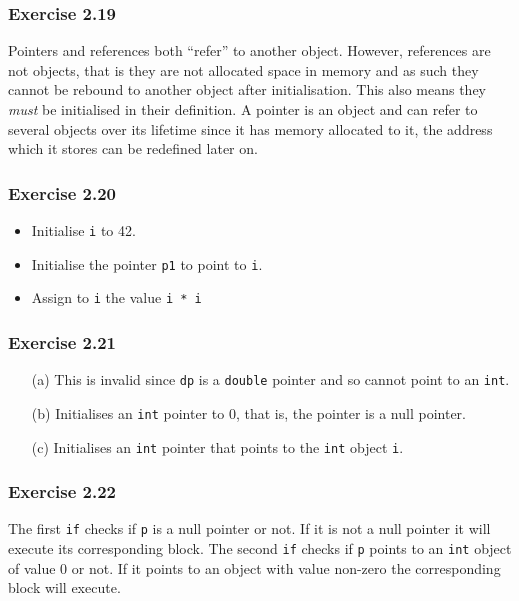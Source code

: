 \documentclass[12pt, a4paper]{article}
\begin{document}
\subsubsection*{Exercise 2.19}
Pointers and references both ``refer'' to another object. However, references are not objects, that is they are not allocated space in memory and as such they cannot be rebound to another object after initialisation. This also means they \textit{must} be initialised in their definition. A pointer is an object and can refer to several objects over its lifetime since it has memory allocated to it, the address which it stores can be redefined later on.

\subsubsection*{Exercise 2.20}
\begin{itemize}
	\item Initialise \texttt{i} to 42.
	\item Initialise the pointer \texttt{p1} to point to \texttt{i}.
	\item Assign to \texttt{i} the value \texttt{i * i}
\end{itemize}

\subsubsection*{Exercise 2.21}
\begin{itemize}
	\item [(a)]
		This is invalid since \texttt{dp} is a \texttt{double} pointer and so cannot point to an \texttt{int}.
	\item [(b)]
		Initialises an \texttt{int} pointer to 0, that is, the pointer is a null pointer.
	\item [(c)]
		Initialises an \texttt{int} pointer that points to the \texttt{int} object \texttt{i}.
\end{itemize}

\subsubsection*{Exercise 2.22}
The first \texttt{if} checks if \texttt{p} is a null pointer or not. If it is not a null pointer it will execute its corresponding block. The second \texttt{if} checks if \texttt{p} points to an \texttt{int} object of value 0 or not. If it points to an object with value non-zero the corresponding block will execute.
\end{document}
